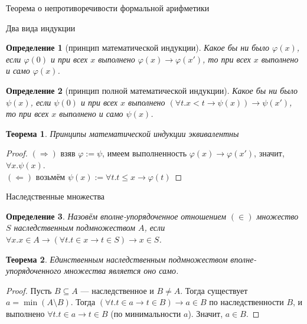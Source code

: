 \documentclass[aspectratio=169]{beamer}
\newtheorem{thm}{Теорема}[section]
\newtheorem{dfn}{Определение}[section]
\begin{document}
\newcommand\doubleplus{+\kern-1.3ex+\kern0.8ex}
\newcommand\mdoubleplus{\ensuremath{\mathbin{+\mkern-10mu+}}}

\begin{frame}{}
\LARGE\begin{center}Теорема о непротиворечивости формальной арифметики\end{center}
\end{frame}

\begin{frame}{Два вида индукции}
\begin{dfn}[принцип математической индукции]
Какое бы ни было $\varphi(x)$, если $\varphi(0)$ и при всех $x$ выполнено $\varphi(x)\rightarrow \varphi(x')$, то
при всех $x$ выполнено и само $\varphi(x)$.
\end{dfn}

\begin{dfn}[принцип полной математической индукции]
Какое бы ни было $\psi(x)$, если $\psi(0)$ и при всех $x$ выполнено $(\forall t.x < t \rightarrow \psi(x))\rightarrow \psi(x')$, то
при всех $x$ выполнено и само $\psi(x)$.
\end{dfn}

\begin{thm}Принципы математической индукции эквивалентны\end{thm}
\begin{proof}
$(\Rightarrow)$ взяв $\varphi := \psi$, имеем выполненность $\varphi(x)\rightarrow\varphi(x')$, значит, $\forall x.\psi(x)$. \pause\\
$(\Leftarrow)$ возьмём $\psi(x) := \forall t.t\le x\rightarrow\varphi(t)$
\end{proof}
\end{frame}

\begin{frame}{Наследственные множества}
\begin{dfn} Назовём вполне-упорядоченное отношением $(\in)$ множество $S$ наследственным подмножеством $A$, если 
$\forall x.x \in A \rightarrow (\forall t.t \in x \rightarrow t \in S) \rightarrow x \in S$.
\end{dfn}
\begin{thm}Единственным наследственным подмножеством вполне-упорядоченного множества является оно само.\end{thm}
\begin{proof}Пусть $B \subseteq A$ --- наследственное и $B \ne A$.
Тогда существует $a = \min (A \setminus B)$. Тогда $(\forall t.t \in a \rightarrow t \in B) \rightarrow a \in B$ по наследственности $B$,
и выполнено $\forall t.t \in a \rightarrow t \in B$ (по минимальности $a$). Значит, $a \in B$.
\end{proof}
\end{frame}
\end{document}
